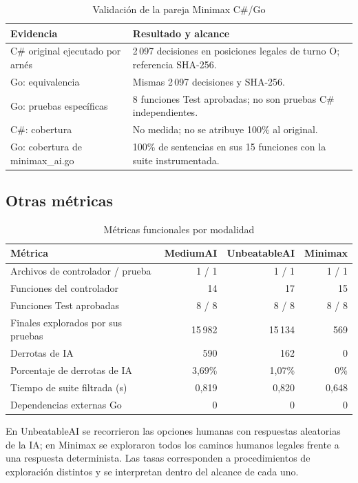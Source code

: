 \documentclass[12pt,a4paper]{article}
\begin{document}
\begin{table}[H]
\centering\small
\caption{Validación de la pareja Minimax C\#/Go}
\begin{tabular}{p{5.8cm}p{7.2cm}}
\toprule Evidencia & Resultado y alcance\\\midrule
C\# original ejecutado por arnés & 2\,097 decisiones en posiciones legales de turno O; referencia SHA-256.\\
Go: equivalencia & Mismas 2\,097 decisiones y SHA-256.\\
Go: pruebas específicas & 8 funciones Test aprobadas; no son pruebas C\# independientes.\\
C\#: cobertura & No medida; no se atribuye 100\% al original.\\
Go: cobertura de minimax\_ai.go & 100\% de sentencias en sus 15 funciones con la suite instrumentada.\\
\bottomrule
\end{tabular}
\end{table}

\subsection{Otras métricas}
\begin{table}[H]
\centering\small
\caption{Métricas funcionales por modalidad}
\begin{tabular}{p{4.4cm}rrr}
\toprule Métrica & MediumAI & UnbeatableAI & Minimax\\\midrule
Archivos de controlador / prueba & 1 / 1 & 1 / 1 & 1 / 1\\
Funciones del controlador & 14 & 17 & 15\\
Funciones Test aprobadas & 8 / 8 & 8 / 8 & 8 / 8\\
Finales explorados por sus pruebas & 15\,982 & 15\,134 & 569\\
Derrotas de IA & 590 & 162 & 0\\
Porcentaje de derrotas de IA & 3,69\% & 1,07\% & 0\%\\
Tiempo de suite filtrada (s) & 0,819 & 0,820 & 0,648\\
Dependencias externas Go & 0 & 0 & 0\\
\bottomrule
\end{tabular}
\end{table}
En UnbeatableAI se recorrieron las opciones humanas con respuestas aleatorias
de la IA; en Minimax se exploraron todos los caminos humanos legales frente a una
respuesta determinista. Las tasas corresponden a procedimientos de exploración
distintos y se interpretan dentro del alcance de cada uno.
\end{document}
